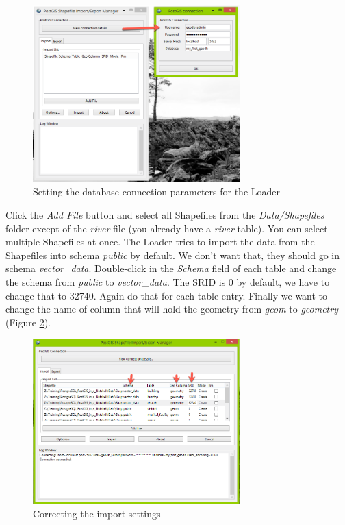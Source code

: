\documentclass[a4paper,12pt,titlepage]{article}
\begin{document}
\begin{figure}[htb]
	\centering
	\includegraphics[width=8cm]{Images/load_shapefiles1.png}
	\caption{Setting the database connection parameters for the Loader}\label{fig:load_shapefiles1}
\end{figure}

Click the \textit{Add File} button and select all Shapefiles from the \textit{Data/Shapefiles} folder except of the \textit{river} file (you already have a \textit{river} table). You can select multiple Shapefiles at once. The Loader tries to import the data from the Shapefiles into schema \textit{public} by default. We don't want that, they should go in schema \textit{vector\_data}. Double-click in the \textit{Schema} field of each table and change the schema from \textit{public} to \textit{vector\_data}. The SRID is 0 by default, we have to change that to 32740. Again do that for each table entry. Finally we want to change the name of column that will hold the geometry from \textit{geom} to \textit{geometry} (Figure \ref{fig:load_shapefiles2}).

\begin{figure}[htb]
	\centering
	\includegraphics[width=8cm]{Images/load_shapefiles2.png}
	\caption{Correcting the import settings}\label{fig:load_shapefiles2}
\end{figure}
\end{document}

